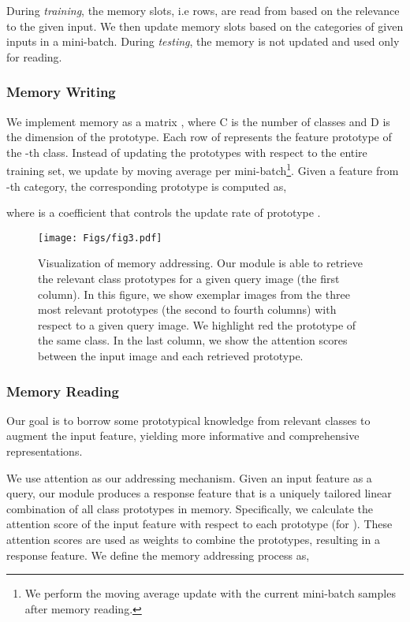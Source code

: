 \documentclass[journal]{IEEEtran}
\begin{document}
During \emph{training}, the memory slots, i.e rows, are read from based on the relevance to the given input. We then update memory slots based on the categories of given inputs in a mini-batch. 
During \emph{testing}, the memory is not updated and used only for reading.

\subsubsection{Memory Writing}
We implement memory as a matrix , where C is the number of classes and D is the dimension of the prototype. Each row  of  represents the feature prototype of the -th class.
Instead of updating the prototypes with respect to the entire training set, we update by moving average per mini-batch\footnote[1]{We perform the moving average update with the current mini-batch samples after memory reading.}.
Given a feature  from -th category, the corresponding prototype  is computed as,  

where   is a coefficient that controls the update rate of prototype .
\begin{figure}[t]
\begin{center}
\texttt{[image: Figs/fig3.pdf]}
\end{center}
\caption{Visualization of memory addressing. Our module is able to retrieve the relevant class prototypes for a given query image (the first column). In this figure, we show exemplar images from the three most relevant prototypes (the second to fourth columns) with respect to a given query image. We highlight red the prototype of the same class. In the last column, we show the attention scores between the input image and each retrieved prototype.}
\label{fig:3}
\end{figure}


\subsubsection{Memory Reading} \label{read}
Our goal is to borrow some prototypical knowledge from relevant classes to augment the input feature, yielding more informative and comprehensive representations.


We use attention as our addressing mechanism. Given an input feature as a query, our module produces a response feature that is a uniquely tailored linear combination of all class prototypes in memory.  
Specifically, we calculate the attention score of the input feature  with respect to each prototype  (for ). These attention scores are used as weights to combine the prototypes, resulting in a response feature.
We define the memory addressing process as, 
\end{document}
